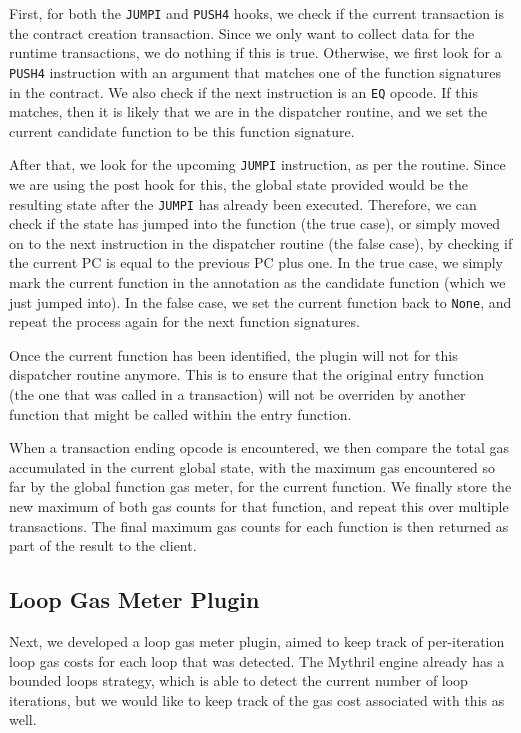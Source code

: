 First, for both the \texttt{JUMPI} and \texttt{PUSH4} hooks, we check if the current 
transaction is the contract creation transaction. Since we only want to collect data 
for the runtime transactions, we do nothing if this is true. Otherwise, we first look for a
\texttt{PUSH4} instruction with an argument that matches one of the function signatures in the contract.
We also check if the next instruction is an \texttt{EQ} opcode.
If this matches, then it is likely that we are in the dispatcher routine, and we set
the current candidate function to be this function signature.

After that, we look for the upcoming \texttt{JUMPI} instruction, as per the routine.
Since we are using the post hook for this, the global state provided would be the resulting
state after the \texttt{JUMPI} has already been executed. Therefore, we can check if the state has
jumped into the function (the true case), or simply moved on to the next instruction in the 
dispatcher routine (the false case), by checking if the current PC is equal to the previous 
PC plus one. In the true case, we simply mark the current function in the annotation as the 
candidate function (which we just jumped into).
In the false case, we set the current function back to \texttt{None}, and repeat the process
again for the next function signatures.

Once the current function has been identified,
the plugin will not for this dispatcher routine anymore. This is to ensure that the original 
entry function (the one that was called in a transaction) will not be overriden by another 
function that might be called within the entry function.

When a transaction ending opcode is encountered, we then compare the total gas accumulated
in the current global state, with the maximum gas encountered so far by the global function gas meter,
for the current function. We finally store the new maximum of both gas counts for that function,
and repeat this over multiple transactions. The final maximum gas counts for each function is
then returned as part of the result to the client.

\subsection{Loop Gas Meter Plugin}

Next, we developed a loop gas meter plugin, aimed to keep track of per-iteration loop
gas costs for each loop that was detected. The Mythril engine already has a 
bounded loops strategy, which is able to detect the current number of loop iterations, 
but we would like to keep track of the gas cost associated with this as well.


